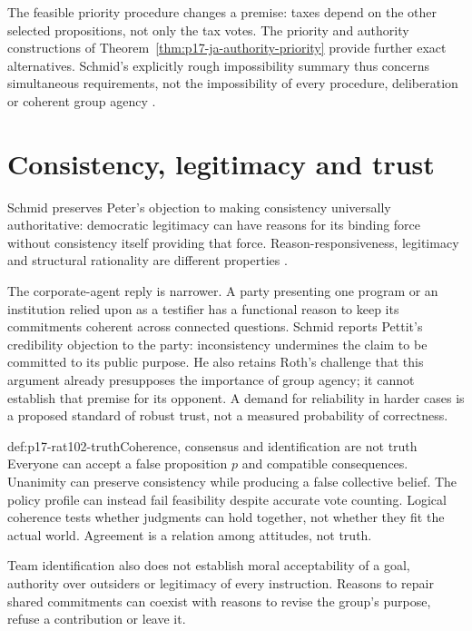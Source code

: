 The feasible priority procedure changes a premise: taxes depend on the
other selected propositions, not only the tax votes. The priority and
authority constructions of Theorem~\ref{thm:p17-ja-authority-priority}
provide further exact alternatives. Schmid's explicitly rough impossibility
summary thus concerns simultaneous requirements, not the impossibility of
every procedure, deliberation or coherent group agency
\parencite[pp.~596--597]{Schmid2021CollectiveRationality}.

\section{Consistency, legitimacy and trust}
\label{sec:p17-rat102-legitimacy}

Schmid preserves Peter's objection to making consistency universally
authoritative: democratic legitimacy can have reasons for its binding
force without consistency itself providing that force. Reason-responsiveness,
legitimacy and structural rationality are different properties
\parencite[p.~596]{Schmid2021CollectiveRationality}.

The corporate-agent reply is narrower. A party presenting one program or an
institution relied upon as a testifier has a functional reason to keep its
commitments coherent across connected questions. Schmid reports Pettit's
credibility objection to the party: inconsistency undermines the claim to
be committed to its public purpose. He also retains Roth's challenge that
this argument already presupposes the importance of group agency; it
cannot establish that premise for its opponent. A demand for reliability
in harder cases is a proposed standard of robust trust, not a measured
probability of correctness.

\begin{hbwarning}{def:p17-rat102-truth}{Coherence, consensus and identification are not truth}
Everyone can accept a false proposition \(p\) and compatible consequences.
Unanimity can preserve consistency while producing a false collective
belief. The policy profile can instead fail feasibility despite accurate
vote counting. Logical coherence tests whether judgments can hold together,
not whether they fit the actual world. Agreement is a relation among
attitudes, not truth.

Team identification also does not establish moral acceptability of a goal,
authority over outsiders or legitimacy of every instruction. Reasons to
repair shared commitments can coexist with reasons to revise the group's
purpose, refuse a contribution or leave it.
\end{hbwarning}

